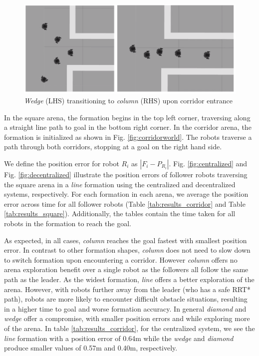 \documentclass[letterpaper, 10 pt, conference]{ieeeconf}  %
\begin{document}
\begin{figure}[tb]
\centering	
\includegraphics[width=0.9\linewidth]{images/switch_formation.png}	
\caption{\textit{Wedge} (LHS) transitioning to \textit{column} (RHS) upon corridor entrance}	
\label{fig:switch_formation}	
\end{figure}

In the square arena, the formation begins in the top left corner, traversing along a straight line path to goal in the bottom right corner. In the corridor arena, the formation is initialized as shown in Fig. \ref{fig:corridorworld}. The robots traverse a path through both corridors, stopping at a goal on the right hand side.

We define the position error for robot $R_i$ as $|F_{i} - P_{R_i}|$. Fig. \ref{fig:centralized} and Fig. \ref{fig:decentralized} illustrate the position errors of follower robots traversing the square arena in a \textit{line} formation using the centralized and decentralized systems, respectively. For each formation in each arena, we average the position error across time for all follower robots (Table \ref{tab:results_corridor} and Table \ref{tab:results_square}). Additionally, the tables contain the time taken for all robots in the formation to reach the goal.

As expected, in all cases, \textit{column} reaches the goal fastest with smallest position error. In contrast to other formation shapes, \textit{column} does not need to slow down to switch formation upon encountering a corridor. However \textit{column} offers no arena exploration benefit over a single robot as the followers all follow the same path as the leader. As the widest formation, \textit{line} offers a better exploration of the arena. However, with robots further away from the leader (who has a safe RRT* path), robots are more likely to encounter difficult obstacle situations, resulting in a higher time to goal and worse formation accuracy. In general \textit{diamond} and \textit{wedge} offer a compromise, with smaller position errors and while exploring more of the arena. In table \ref{tab:results_corridor}, for the centralized system, we see the \textit{line} formation with a position error of 0.64m while the \textit{wedge} and \textit{diamond} produce smaller values of 0.57m and 0.40m, respectively.
\end{document}
